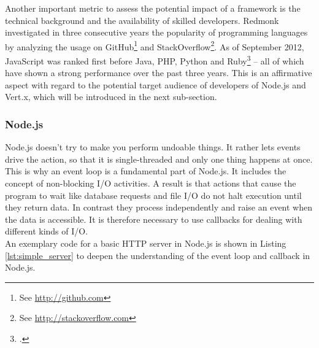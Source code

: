Another important metric to assess the potential impact of a framework is the
technical background and the availability of skilled developers. Redmonk
investigated in three consecutive years the popularity of programming languages
by analyzing the usage on GitHub\footnote{See \url{http://github.com}} and
StackOverflow\footnote{See \url{http://stackoverflow.com}}. As of September
2012, JavaScript was ranked first before Java, PHP, Python and
Ruby\footcite[Cf.][]{Redmonk_2012} – all of which have shown a strong
performance over the past three years. This is an affirmative aspect with regard
to the potential target audience of developers of Node.js and Vert.x, which will
be introduced in the next sub-section.

\FloatBarrier

\subsubsection{Node.js}
\label{node.js}



Node.js doesn't try to make you perform undoable things. It rather lets events drive the
action, so that it is single-threaded and only one thing happens at once. This
is why an event loop is a fundamental part of Node.js. It includes the concept
of non-blocking I/O activities. A result is that actions that cause the program
to wait like database requests and file I/O  do not halt execution until they
return data. In contrast they process independently and raise an event when the
data is accessible. It is therefore necessary to use callbacks for dealing with
different kinds of I/O.\\
An exemplary code for a basic HTTP server in Node.js is shown in Listing
\ref{lst:simple_server} to deepen the understanding of the event loop and
callback in Node.js.





